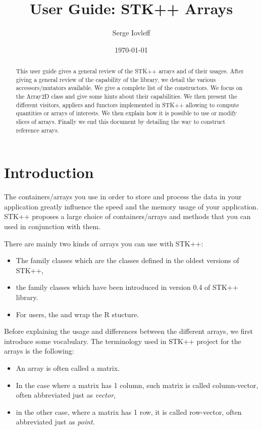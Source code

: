 \documentclass[a4paper,10pt]{article}
\title{ User Guide: STK++ Arrays}
\author{Serge Iovleff}
\date{\today}
\begin{document}


\maketitle
\begin{abstract}
This user guide gives a general review of the STK++ arrays and of their usages.
After giving a general review of the capability of the library, we detail the
various accessors/mutators available. We give a complete list of the
constructors. We focus on the Array2D class and give some hints about their
capabilities. We then present the different visitors, appliers and functors
implemented in STK++ allowing to compute quantities or arrays of interests. We
then explain how it is possible to use or modify slices of arrays. Finally we end
this document by detailing the way to construct reference arrays.
\end{abstract}

\section{Introduction}

The containers/arrays you use in order to store and process the data in your
application greatly influence the speed and the memory usage of your application.
STK++ proposes a large choice of containers/arrays and methods that you can used
in conjunction with them.

There are mainly two kinds of arrays you can use with STK++:
\begin{itemize}
\item The  family classes which are the classes defined in the
oldest versions of STK++,
\item the  family classes which have been introduced in version
0.4 of STK++ library.
\item For \rtkore{} users, the  and  wrap the
R  stucture.
\end{itemize}

Before explaining the usage and differences between the different arrays,
we first introduce some vocabulary. The terminology used in STK++ project for
the arrays is the following:
\begin{itemize}
\item An array is often called a matrix.
\item In the case where a matrix has 1 column, such matrix is called
column-vector, often abbreviated just as \emph{vector},
\item in the other case, where a matrix has 1 row, it is called row-vector,
often abbreviated just as \emph{point}.
\end{itemize}
\end{document}
